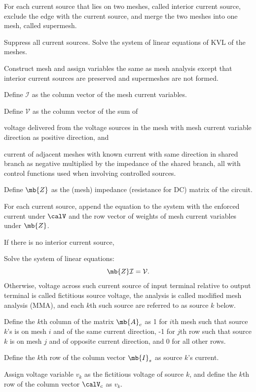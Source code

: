 \documentclass[a4paper,12pt]{article}
\begin{document}
\item For each current source that lies on two meshes, called interior current source, exclude the edge with the current source, and merge the two meshes into one mesh, called supermesh.
\item Suppress all current sources. Solve the system of linear equations of KVL of the meshes.
\een
{}
\ben
\item Construct mesh and assign variables the same as mesh analysis except that interior current sources are preserved and supermeshes are not formed.
\item Define $\mathcal{I}$ as the column vector of the mesh current variables.
\item Define $\mathcal{V}$ as the column vector of the sum of
\bit
\item voltage delivered from the voltage sources in the mesh with mesh current variable direction as positive direction, and
\item current of adjacent meshes with known current with same direction in shared branch as negative multiplied by the impedance of the shared branch,
\eit
all with control functions used when involving controlled sources.
\item Define $\mb{Z}$ as the (mesh) impedance (resistance for DC) matrix of the circuit.
\item For each current source, append the equation to the system with the enforced current under $\calV$ and the row vector of weights of mesh current variables under $\mb{Z}$.
\item If there is no interior current source,
\ben
\item Solve the system of linear equations:
\[\mb{Z}\mathcal{I}=\mathcal{V}.\]
\een
Otherwise, voltage across such current source of input terminal relative to output terminal is called fictitious source voltage, the analysis is called modified mesh analysis (MMA), and each $k$th such source are referred to as source $k$ below.
\ben
\item Define the $k$th column of the matrix $\mb{A}_c$ as 1 for $i$th mesh such that source $k$'s is on mesh $i$ and of the same current direction, -1 for $j$th row such that source $k$ is on mesh $j$ and of opposite current direction, and 0 for all other rows.
\item Define the $k$th row of the column vector $\mb{I}_s$ as source $k$'s current.
\item Assign voltage variable $v_k$ as the fictitious voltage of source $k$, and define the $k$th row of the column vector $\calV_c$ as $v_k$.
\end{document}
